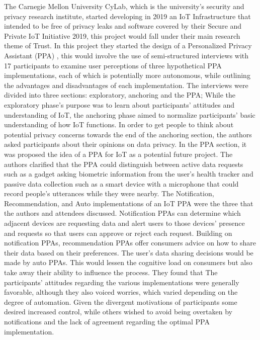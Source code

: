 \documentclass[conference]{IEEEtran}
\begin{document}
The Carnegie Mellon University CyLab, which is the university's security
and privacy research institute, started developing in 2019 an IoT Infrastructure
that intended to be free of privacy leaks and software covered by their
Secure and Private IoT Initiative 2019, this project would fall under
their main research theme of Trust. In this project they started the design
of a Personalized Privacy Assistant (PPA) \cite{ColnagoInforming}, this
would involve the use of semi-structured interviews with 17 participants
to examine user perceptions of three hypothetical PPA implementations,
each of which is potentially more autonomous, while outlining the advantages
and disadvantages of each implementation. The interviews were divided into
three sections: exploratory, anchoring and the PPA; While the exploratory
phase's purpose was to learn about participants' attitudes and understanding
of IoT, the anchoring phase aimed to normalize participants' basic understanding
of how IoT functions. In order to get people to think about potential privacy
concerns towards the end of the anchoring section, the authors asked participants
about their opinions on data privacy. In the PPA section, it was proposed
the idea of a PPA for IoT as a potential future project. The authors clarified
that the PPA could distinguish between active data requests such as a gadget
asking biometric information from the user's health tracker and passive data
collection such as a smart device with a microphone that could record people's
utterances while they were nearby. The Notification, Recommendation, and Auto
implementations of an IoT PPA were the three that the authors and attendees
discussed. Notification PPAs can determine which adjacent devices are requesting
data and alert users to those devices' presence and requests so that users
can approve or reject each request. Building on notification PPAs, recommendation
PPAs offer consumers advice on how to share their data based on their preferences.
The user's data sharing decisions would be made by auto PPAs. This would lessen
the cognitive load on consumers but also take away their ability to influence
the process. They found that The participants' attitudes regarding the various
implementations were generally favorable, although they also voiced worries,
which varied depending on the degree of automation. Given the divergent
motivations of participants some desired increased control, while others
wished to avoid being overtaken by notifications and the lack of agreement
regarding the optimal PPA implementation.
\end{document}
